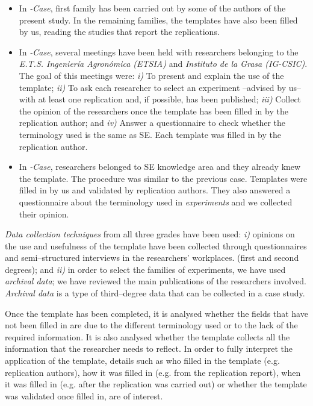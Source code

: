\begin{itemize}
    \item In \emph{\SoftEng-Case}, first family has been carried out by some of the authors of the present study. In the remaining families, the templates have also been filled by us, reading the studies that report the replications.
	
    \item In \emph{\Science-Case}, several meetings have been held with researchers belonging to the \emph{E.T.S. Ingeniería Agronómica (ETSIA)} and \emph{Instituto  de la Grasa (IG-CSIC)}. The goal of this meetings were: \emph{i)} To present and explain the use of the template; \emph{ii)} To ask each researcher to select an experiment --advised by us-- with at least one replication and, if possible, has been published; \emph{iii)} Collect the opinion of the researchers once the template has been filled in by the replication author; and \emph{iv)} Answer a questionnaire to check whether the terminology used is the same as \gls{SE}. Each template was filled in by the replication author.
    
    \item In \emph{\Automatic-Case}, researchers belonged to \gls{SE} knowledge area and they already knew the template.  The procedure was similar to the previous case. 
    Templates were filled in by us and validated by replication authors. They also answered a questionnaire about the terminology used in \emph{\Automatic experiments} and we collected their opinion.
\end{itemize}
    
\emph{Data collection techniques} from all three grades have been used:
    \emph{i)} opinions on the use and usefulness of the template have been collected through questionnaires and semi--structured interviews in the researchers' workplaces. (first and second degrees); and \emph{ii)} in order to select the families of experiments, we have used \emph{archival data}; we have reviewed the main publications of the researchers involved. \emph{Archival data} is a type of third--degree data that can be collected in a case study.   

Once the template has been completed, it is analysed whether the fields that have not been filled in are due to the different terminology used or to the lack of the required information. %
It is also analysed whether the template collects all the information that the researcher needs to reflect.
In order to fully interpret the application of the template, details such as who filled in the template (e.g. replication authors), how it was filled in (e.g. from the replication report), when it was filled in (e.g. after the replication was carried out) or whether the template was validated once filled in, are of interest.
     
